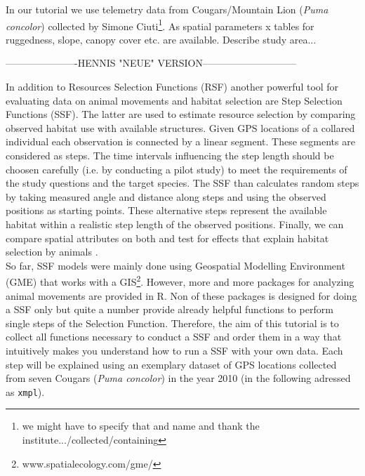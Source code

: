 \documentclass[11pt, a4paper]{article}\usepackage[]{graphicx}\usepackage[]{color}
\begin{document}
In our tutorial we use telemetry data from Cougars/Mountain Lion (\textit{Puma concolor}) collected by Simone Ciuti\footnote{we might have to specify that and name and thank the institute.../collected/containing}. As spatial parameters x tables for ruggedness, slope, canopy cover etc. are available. Describe study area...\



----------------------HENNIS "NEUE" VERSION-----------------------------

In addition to Resources Selection Functions (RSF) another powerful tool for evaluating data on animal movements and habitat selection are Step Selection Functions (SSF). The latter are used to estimate resource selection by comparing observed habitat use with available structures. Given GPS locations of a collared individual each observation is connected by a linear segment. These segments are considered as steps. The time intervals influencing the step length should be choosen carefully (i.e. by conducting a pilot study) to meet the requirements of the study questions and the target species. The SSF than calculates random steps by taking measured angle and distance along steps and using the observed positions as starting points. These alternative steps represent the available habitat within a realistic step length of the observed positions. Finally, we can compare spatial attributes on  both and test for effects that explain habitat selection by animals \cite{thurfjell2014applications}.\\ So far, SSF models were mainly done using Geospatial Modelling Environment (GME) that works with a GIS\footnote{www.spatialecology.com/gme/}. However, more and more packages for analyzing animal movements are provided in R. Non of these packages is designed for doing a SSF only but quite a number provide already helpful functions to perform single steps of the Selection Function. Therefore, the aim of this tutorial is to collect all functions necessary to conduct a SSF and order them in a  way that intuitively makes you understand how to run a SSF with your own data. Each step will be explained using an exemplary dataset of GPS locations collected from seven Cougars (\textit{Puma concolor}) in the year 2010 (in the following adressed as \texttt{xmpl}).\\
\end{document}
